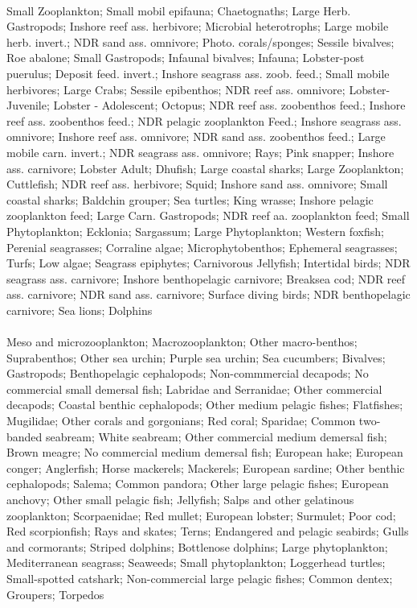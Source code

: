 \fullhline
\hline
{} \\
\hline
Small Zooplankton; Small mobil epifauna; Chaetognaths; Large Herb. Gastropods; Inshore reef ass. herbivore; Microbial heterotrophs; Large mobile herb. invert.; NDR sand ass. omnivore; Photo. corals/sponges; Sessile bivalves; Roe abalone; Small Gastropods; Infaunal bivalves; Infauna; Lobster-post puerulus; Deposit feed. invert.; Inshore seagrass ass. zoob. feed.; Small mobile herbivores; Large Crabs; Sessile epibenthos; NDR reef ass. omnivore; Lobster- Juvenile; Lobster - Adolescent; Octopus; NDR reef ass. zoobenthos feed.; Inshore reef ass. zoobenthos feed.; NDR pelagic zooplankton Feed.; Inshore seagrass ass. omnivore; Inshore reef ass. omnivore; NDR sand ass. zoobenthos feed.; Large mobile carn. invert.; NDR seagrass ass. omnivore; Rays; Pink snapper; Inshore ass. carnivore; Lobster Adult; Dhufish; Large coastal sharks; Large Zooplankton; Cuttlefish; NDR reef ass. herbivore; Squid; Inshore sand ass. omnivore; Small coastal sharks; Baldchin grouper; Sea turtles; King wrasse; Inshore pelagic zooplankton feed; Large Carn. Gastropods; NDR reef aa. zooplankton feed; Small Phytoplankton; Ecklonia; Sargassum; Large Phytoplankton; Western foxfish; Perenial seagrasses; Corraline algae; Microphytobenthos; Ephemeral seagrasses; Turfs; Low algae; Seagrass epiphytes; Carnivorous Jellyfish; Intertidal birds; NDR seagrass ass. carnivore; Inshore benthopelagic carnivore; Breaksea cod; NDR reef ass. carnivore; NDR sand ass. carnivore; Surface diving birds; NDR benthopelagic carnivore; Sea lions; Dolphins\\
\fullhline
\hline
{} \\
\hline
Meso and microzooplankton; Macrozooplankton; Other macro-benthos; Suprabenthos; Other sea urchin; Purple sea urchin; Sea cucumbers; Bivalves; Gastropods; Benthopelagic cephalopods; Non-commmercial decapods; No commercial small demersal fish; Labridae and Serranidae; Other commercial decapods; Coastal benthic cephalopods; Other medium pelagic fishes; Flatfishes; Mugilidae; Other corals and gorgonians; Red coral; Sparidae; Common two-banded seabream; White seabream; Other commercial medium demersal fish; Brown meagre; No commercial medium demersal fish; European hake; European conger; Anglerfish; Horse mackerels; Mackerels; European sardine; Other benthic cephalopods; Salema; Common pandora; Other large pelagic fishes; European anchovy; Other small pelagic fish; Jellyfish; Salps and other gelatinous zooplankton; Scorpaenidae; Red mullet; European lobster; Surmulet; Poor cod; Red scorpionfish; Rays and skates; Terns; Endangered and pelagic seabirds; Gulls and cormorants; Striped dolphins; Bottlenose dolphins; Large phytoplankton; Mediterranean seagrass; Seaweeds; Small phytoplankton; Loggerhead turtles; Small-spotted catshark; Non-commercial large pelagic fishes; Common dentex; Groupers; Torpedos\\
